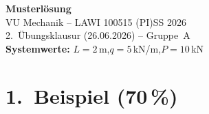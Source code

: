 \documentclass[a4paper,11pt]{article}
\begin{document}

\begin{center}
  {\Large\bfseries Musterlösung}\\[4pt]
  {\large VU Mechanik -- LAWI 100515 (PI)\quad SS 2026}\\[2pt]
  {\normalsize 2.~Übungsklausur (26.06.2026) -- Gruppe~A}\\[2pt]
  {\normalsize \textbf{Systemwerte:} $L = 2$\,m,\quad $q = 5$\,kN/m,\quad $P = 10$\,kN}
\end{center}

\section*{1.~Beispiel \hfill (70\,\%)}
\end{document}
